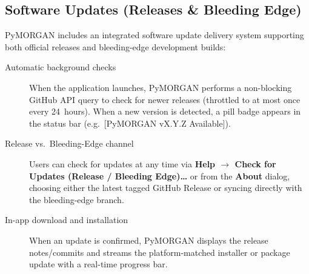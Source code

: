 \subsection{Software Updates (Releases \& Bleeding Edge)}\label{sec:updates}

PyMORGAN includes an integrated software update delivery system supporting both official releases and bleeding-edge development builds:

\begin{description}
  \item[Automatic background checks] When the application launches, PyMORGAN performs a non-blocking GitHub API query to check for newer releases (throttled to at most once every 24~hours). When a new version is detected, a pill badge appears in the status bar (e.g.\ \textsf{[PyMORGAN vX.Y.Z Available]}).
  \item[Release vs.\ Bleeding-Edge channel] Users can check for updates at any time via \textbf{Help $\to$ Check for Updates (Release / Bleeding Edge)\ldots} or from the \textbf{About} dialog, choosing either the latest tagged GitHub Release or syncing directly with the bleeding-edge  branch.
  \item[In-app download and installation] When an update is confirmed, PyMORGAN displays the release notes/commits and streams the platform-matched installer or package update with a real-time progress bar.
\end{description}

